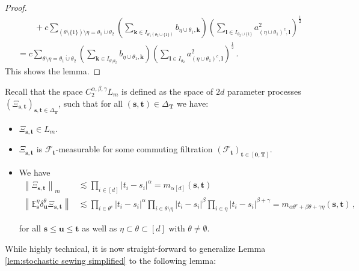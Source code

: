\documentclass[11pt,oneside,english,reqno]{amsart}
\numberwithin{equation}{section}
\numberwithin{figure}{section}
\theoremstyle{plain}
\theoremstyle{definition}
\theoremstyle{remark}
\theoremstyle{plain}
\theoremstyle{plain}
\theoremstyle{plain}
\theoremstyle{plain}
\theoremstyle{plain}
\newcommand{\cF}{\mathcal{F}}
\newcommand{\EE}{\mathbb{E}}
\newcommand{\bk}{\mathbf{k}}
\newcommand{\bl}{\mathbf l}
\newcommand{\bT}{\mathbf{T}}
\newcommand{\boo}{\mathbf{0}}
\newcommand{\bu}{\mathbf{u}}
\newcommand{\bs}{\mathbf{s}}
\newcommand{\bt}{\mathbf{t}}
\newcommand{\norm}[1]{\left\lVert #1\right\rVert}
\newcommand{\abs}[1]{\left\lvert #1\right\rvert}
\begin{document}
\begin{proof}
\begin{align*}
        &\qquad + c\sum_{(\theta\setminus\{1\})\setminus\eta = \theta_1\dot\cup\theta_2} \left(\sum_{\bk\in I_{\theta\setminus(\theta_2\cup\{1\})}} b_{\eta\cup\theta_1,\bk}\right)\left(\sum_{\bl\in I_{\theta_2\cup\{1\}}} a_{(\eta\cup\theta_1)^c,\bl}^2\right)^{\frac 12}\\
        &= c\sum_{\theta\setminus\eta=\theta_1\dot\cup\theta_2} \left(\sum_{\bk\in I_{\theta\setminus\theta_2}}b_{\eta\cup\theta_1,\bk}\right)\left(\sum_{\bl\in I_{\theta_2}} a_{(\eta\cup\theta_1)^c,\bl}^2\right)^{\frac 12}\,.
    \end{align*}    
%
    This shows the lemma.
\end{proof}
%
\noindent Recall that the space $C_2^{\alpha,\beta,\gamma}L_m$ is defined as the space of $2d$ parameter processes $(\Xi_{\bs,\bt})_{\bs,\bt\in\Delta_\bT}$, such that for all $(\bs,\bt)\in\Delta_\bT$ we have:

\begin{itemize}
    \item $\Xi_{\bs,\bt}\in L_m$.
    \item $\Xi_{\bs,\bt}$ is $\cF_\bt$-measurable for some commuting filtration $(\cF_\bt)_{\bt\in[\boo,\bT]}$.
    \item We have 
    \begin{align*}
        \norm{\Xi_{\bs,\bt}}_m &\lesssim \prod_{i\in[d]}\abs{t_i-s_i}^\alpha = m_{\alpha[d]}(\bs,\bt) \\
        \norm{\EE^\eta_\bs\delta_\bu^\theta\Xi_{\bs,\bt}}&\lesssim \prod_{i\in\theta^c}\abs{t_i-s_i}^\alpha\prod_{i\in\theta\setminus\eta}\abs{t_i-s_i}^{\beta}\prod_{i\in\eta}\abs{t_i-s_i}^{\beta+\gamma} = m_{\alpha\theta^c+\beta\theta+\gamma\eta}(\bs,\bt)\,,
    \end{align*}

    \noindent for all $\bs\le\bu\le\bt$ as well as $\eta\subset\theta\subset[d]$ with $\theta\neq\emptyset$.
\end{itemize}

\noindent While highly technical, it is now straight-forward to generalize Lemma \ref{lem:stochastic sewing simplified} to the following lemma:
\end{document}
